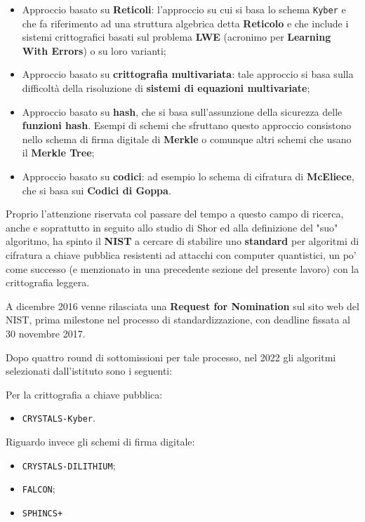 \documentclass[a4paper, 12pt, oneside]{article}
\theoremstyle{definition}
\begin{document}
\begin{itemize}
    \item Approccio basato su \textbf{Reticoli}: l'approccio su cui si basa lo schema \texttt{Kyber} e che fa riferimento ad una struttura algebrica detta \textbf{Reticolo} e che include i sistemi crittografici basati sul problema \textbf{LWE} (acronimo per \textbf{Learning With Errors}) o su loro varianti;
    \item Approccio basato su \textbf{crittografia multivariata}: tale approccio si basa sulla difficoltà della risoluzione di \textbf{sistemi di equazioni multivariate};
    \item Approccio basato su \textbf{hash}, che si basa sull'assunzione della sicurezza delle \textbf{funzioni hash}. Esempi di schemi che sfruttano questo approccio consistono nello schema di firma digitale di \textbf{Merkle} o comunque altri schemi che usano il \textbf{Merkle Tree};
    \item Approccio basato su \textbf{codici}: ad esempio lo schema di cifratura di \textbf{McEliece}, che si basa sui \textbf{Codici di Goppa}.
\end{itemize}

Proprio l'attenzione riservata col passare del tempo a questo campo di ricerca, anche e soprattutto in seguito allo studio di Shor ed alla definizione del "suo" algoritmo, ha spinto il \textbf{NIST} a cercare di stabilire uno \textbf{standard} per algoritmi di cifratura a chiave pubblica resistenti ad attacchi con computer quantistici, un po' come successo (e menzionato in una precedente sezione del presente lavoro) con la crittografia leggera. 

A dicembre 2016 \cite{nist-pqc-nomination} venne rilasciata una \textbf{Request for Nomination} sul sito web del NIST, prima milestone nel processo di standardizzazione, con deadline fissata al 30 novembre 2017. 

Dopo quattro round di sottomissioni per tale processo, nel 2022 gli algoritmi selezionati dall'istituto sono i seguenti:

Per la crittografia a chiave pubblica:

\begin{itemize}
    \item \texttt{CRYSTALS-Kyber}.
\end{itemize}

Riguardo invece gli schemi di firma digitale:

\begin{itemize}
    \item \texttt{CRYSTALS-DILITHIUM};
    \item \texttt{FALCON};
    \item \texttt{SPHINCS+}
\end{itemize}
\end{document}
